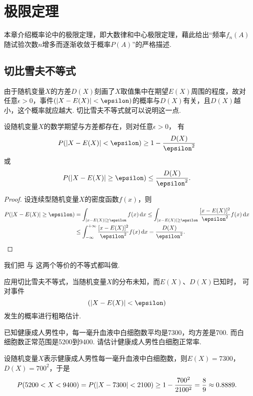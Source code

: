\chapter{极限定理}
本章介绍概率论中的极限定理，即大数律和中心极限定理，藉此给出“频率\(f_n(A)\)随试验次数\(n\)增多而逐渐收敛于概率\(P(A)\)”的严格描述.

\section{切比雪夫不等式}
由于随机变量\(X\)的方差\(D(X)\)刻画了\(X\)取值集中在期望\(E(X)\)周围的程度，故对任意\(\epsilon>0\)，事件\((\abs{X - E(X)} < \epsilon)\)的概率与\(D(X)\)有关，且\(D(X)\)越小，这个概率就应越大.
切比雪夫不等式就可以说明这一点.
\begin{theorem}[切比雪夫不等式]\label{theorem:极限定理.切比雪夫不等式}
设随机变量\(X\)的数学期望与方差都存在，则对任意\(\epsilon > 0\)，
有\begin{equation}\label{equation:极限定理.切比雪夫不等式1}
P(\abs{X-E(X)}<\epsilon) \geq 1 - \frac{D(X)}{\epsilon^2}
\end{equation}或\begin{equation}\label{equation:极限定理.切比雪夫不等式2}
P(\abs{X-E(X)}\geq\epsilon) \leq \frac{D(X)}{\epsilon^2}.
\end{equation}
\begin{proof}
设连续型随机变量\(X\)的密度函数\(f(x)\)，则\begin{align*}
P(\abs{X-E(X)}\geq\epsilon)
&=\int_{\abs{x-E(X)}\geq\epsilon} f(x) \dd{x}
\leq \int_{\abs{x-E(X)}\geq\epsilon} \frac{[x - E(X)]^2}{\epsilon^2} f(x) \dd{x} \\
&\leq \int_{-\infty}^{+\infty} \frac{[x-E(X)]^2}{\epsilon^2} f(x) \dd{x}
=\frac{D(X)}{\epsilon^2}.
\qedhere
\end{align*}
\end{proof}
\end{theorem}

我们把 
与 
这两个等价的不等式都叫做.

应用切比雪夫不等式，当随机变量\(X\)的分布未知，而\(E(X)\)、\(D(X)\)已知时，
可对事件\[
(\abs{X-E(X)}<\epsilon)
\]发生的概率进行粗略估计.

\begin{example}
已知健康成人男性中，每一毫升血液中白细胞数平均是7300，均方差是700.
而白细胞数正常范围是5200到9400.
请估计健康成人男性白细胞正常率.
\begin{solution}
设随机变量\(X\)表示健康成人男性每一毫升血液中白细胞数，则\(E(X) = 7300\)，\(D(X) = 700^2\)，于是\[
P(5200 < X < 9400)
= P(\abs{X - 7300} < 2100)
\geq 1 - \frac{700^2}{2100^2} = \frac{8}{9}
\approx 0.8889.
\]
\end{solution}
\end{example}

